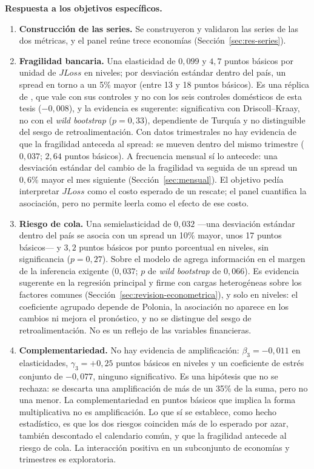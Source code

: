 \textbf{Respuesta a los objetivos específicos.}
\begin{enumerate}
    \item \textbf{Construcción de las series.} Se construyeron y validaron las series de las dos métricas, y el panel reúne trece economías (Sección~\ref{sec:res-series}).
    \item \textbf{Fragilidad bancaria.} Una elasticidad de $0{,}099$ y $4{,}7$ puntos básicos por unidad de $JLoss$ en niveles; por desviación estándar dentro del país, un spread en torno a un 5\% mayor (entre 13 y 18 puntos básicos). Es una réplica de \citet{Chari2024b}, que vale con sus controles y no con los seis controles domésticos de esta tesis ($-0{,}008$), y la evidencia es sugerente: significativa con Driscoll--Kraay, no con el \textit{wild bootstrap} ($p=0{,}33$), dependiente de Turquía y no distinguible del sesgo de retroalimentación. Con datos trimestrales no hay evidencia de que la fragilidad anteceda al spread: se mueven dentro del mismo trimestre ($0{,}037$; $2{,}64$ puntos básicos). A frecuencia mensual sí lo antecede: una desviación estándar del cambio de la fragilidad va seguida de un spread un $0{,}6\%$ mayor el mes siguiente (Sección~\ref{sec:mensual}). El objetivo pedía interpretar $JLoss$ como el costo esperado de un rescate; el panel cuantifica la asociación, pero no permite leerla como el efecto de ese costo.
    \item \textbf{Riesgo de cola.} Una semielasticidad de $0{,}032$ ---una desviación estándar dentro del país se asocia con un spread un 10\% mayor, unos 17 puntos básicos--- y $3{,}2$ puntos básicos por punto porcentual en niveles, sin significancia ($p=0{,}27$). Sobre el modelo de \citet{Chari2024b} agrega información en el margen de la inferencia exigente ($0{,}037$; $p$ de \textit{wild bootstrap} de $0{,}066$). Es evidencia sugerente en la regresión principal y firme con cargas heterogéneas sobre los factores comunes (Sección~\ref{sec:revision-econometrica}), y solo en niveles: el coeficiente agrupado depende de Polonia, la asociación no aparece en los cambios ni mejora el pronóstico, y no se distingue del sesgo de retroalimentación. No es un reflejo de las variables financieras.
    \item \textbf{Complementariedad.} No hay evidencia de amplificación: $\beta_3=-0{,}011$ en elasticidades, $\gamma_3=+0{,}25$ puntos básicos en niveles y un coeficiente de estrés conjunto de $-0{,}077$, ninguno significativo. Es una hipótesis que no se rechaza: se descarta una amplificación de más de un 35\% de la suma, pero no una menor. La complementariedad en puntos básicos que implica la forma multiplicativa no es amplificación. Lo que sí se establece, como hecho estadístico, es que los dos riesgos coinciden más de lo esperado por azar, también descontado el calendario común, y que la fragilidad antecede al riesgo de cola. La interacción positiva en un subconjunto de economías y trimestres es exploratoria.
\end{enumerate}
